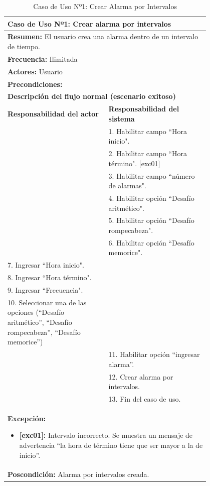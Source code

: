 \begin{table}[H]
    \centering
    \caption{Caso de Uso Nº1: Crear Alarma por Intervalos}
    \vspace{10pt}
    \begin{tabular}{| p{0.4\linewidth} | p{0.4\linewidth} |}
        \hline
        \multicolumn{2}{|l|}{\textbf{Caso de Uso Nº1:}  Crear alarma por intervalos} \\
        \hline
        \multicolumn{2}{|l|}{\textbf{Resumen:}  El usuario crea una alarma dentro de un intervalo de tiempo.} \\
        \hline
        \multicolumn{2}{|l|}{\textbf{Frecuencia:}  Ilimitada} \\
        \hline
        \multicolumn{2}{|l|}{\textbf{Actores:}  Usuario} \\
        \hline
        \multicolumn{2}{|l|}{\textbf{Precondiciones:}} \\
        \hline
        \multicolumn{2}{|l|}{\textbf{Descripción del flujo normal (escenario exitoso)} } \\
        \hline
        \textbf{Responsabilidad del actor} & \textbf{Responsabilidad del sistema}\\
            & 1. Habilitar campo ``Hora inicio".\\
            & 2. Habilitar campo ``Hora término". [exc01]\\
            & 3. Habilitar campo ``número de alarmas". \\
            & 4. Habilitar opción ``Desafío aritmético".\\
            & 5. Habilitar opción ``Desafío rompecabeza".\\
            & 6. Habilitar opción ``Desafío memorice".\\
        7. Ingresar ``Hora inicio". &\\
        8. Ingresar ``Hora término". &\\
        9. Ingresar ``Frecuencia". &\\
        10. Seleccionar una de las opciones (“Desafío aritmético”, “Desafío rompecabeza”, “Desafío memorice”) &\\
            & 11. Habilitar opción ``ingresar alarma''.\\
            & 12. Crear alarma por intervalos.\\
            & 13. Fin del caso de uso. \\
        \hline
        \multicolumn{2}{|p{0.8\linewidth}|}{
            \textbf{Excepción:}
            \begin{itemize}
                \item \textbf{[exc01]:} Intervalo incorrecto. Se muestra un mensaje de advertencia “la hora de término tiene que ser mayor a la de inicio”.
            \end{itemize}}\\  
        \hline
        \multicolumn{2}{|l|}{\textbf{Poscondición:}  Alarma por intervalos creada.} \\
        \hline
    
    \end{tabular}    
    
    \label{table:1}
\end{table}

